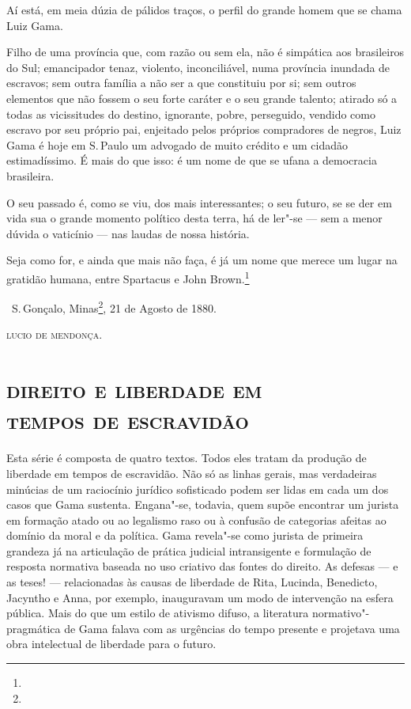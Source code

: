 Aí está, em meia dúzia de pálidos traços, o perfil do grande homem que
se chama Luiz Gama.

Filho de uma província que, com razão ou sem ela, não é simpática aos
brasileiros do Sul; emancipador tenaz, violento, inconciliável, numa
província inundada de escravos; sem outra família a não ser a que
constituiu por si; sem outros elementos que não fossem o seu forte
caráter e o seu grande talento; atirado só a todas as vicissitudes do
destino, ignorante, pobre, perseguido, vendido como escravo por seu
próprio pai, enjeitado pelos próprios compradores de negros, Luiz Gama é
hoje em S.\,Paulo um advogado de muito crédito e um cidadão
estimadíssimo. É mais do que isso: é um nome de que se ufana a
democracia brasileira.

O seu passado é, como se viu, dos mais interessantes; o seu futuro, se
se der em vida sua o grande momento político desta terra, há de ler"-se
--- sem a menor dúvida o vaticínio --- nas laudas de nossa história.

Seja como for, e ainda que mais não faça, é já um nome que merece um
lugar na gratidão humana, entre Spartacus e John Brown.\footnote{}

\vfill

\hfill\ S.\,Gonçalo, Minas\footnote{}, 21 de Agosto de 1880.\smallskip

\hfill\textsc{lucio de mendonça.}

\paginabranca
\begingroup\makeatletter\@openrightfalse
\part[direito e liberdade em tempos de escravidão]{\textsc{direito e liberdade em\\ tempos de escravidão}}

\mbox{}\vfill
\thispagestyle{empty}
{\small\noindent
Esta série é composta de quatro textos. Todos eles tratam da
produção de liberdade em tempos de escravidão. Não só as linhas gerais,
mas verdadeiras minúcias de um raciocínio jurídico sofisticado podem ser
lidas em cada um dos casos que Gama sustenta. Engana"-se, todavia, quem
supõe encontrar um jurista em formação atado ou ao legalismo raso ou à
confusão de categorias afeitas ao domínio da moral e da política. Gama
revela"-se como jurista de primeira grandeza já na articulação de prática
judicial intransigente e formulação de resposta normativa baseada no uso
criativo das fontes do direito. As defesas --- e as teses! ---
relacionadas às causas de liberdade de Rita, Lucinda, Benedicto,
Jacyntho e Anna, por exemplo, inauguravam um modo de intervenção na
esfera pública. Mais do que um estilo de ativismo difuso, a literatura
normativo"-pragmática de Gama falava com as urgências do tempo presente e
projetava uma obra intelectual de liberdade para o futuro.}

